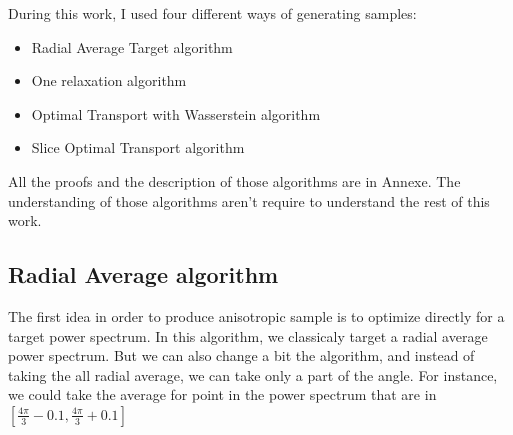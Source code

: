 \documentclass{classeENS}
\begin{document}
During this work, I used four different ways of generating samples:
\begin{itemize}
    \item Radial Average Target algorithm
    \item One relaxation algorithm
    \item Optimal Transport with Wasserstein algorithm
    \item Slice Optimal Transport algorithm
\end{itemize}
All the proofs and the description of those algorithms are in Annexe. 
The understanding of those algorithms aren't require to understand the rest of this work.

\subsection{Radial Average algorithm}
    \> The first idea in order to produce anisotropic sample is to optimize directly for a 
    target power spectrum. In this algorithm, we classicaly target a radial average 
    power spectrum. But we can also change a bit the algorithm, and instead of taking
    the all radial average,
    we can take only a part of the angle. For instance, we could take the average for
    point in the power spectrum that are in $[\frac{4\pi}{3} - 0.1, \frac{4\pi}{3}+0.1]$
    
\end{document}
